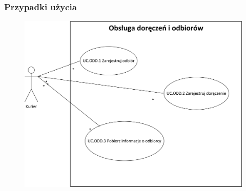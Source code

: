 \subsubsection*{Przypadki użycia}
\begin{figure}[H]
\centering
\includegraphics[width=\textwidth]{img/obs_dor_odb_uc}
\end{figure}

